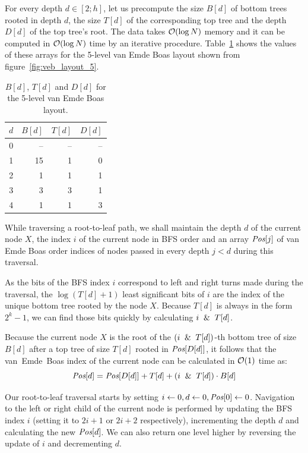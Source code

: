 For every depth $d\in[2;h]$, let us precompute the size $B[d]$ of
bottom trees rooted in depth $d$, the size $T[d]$ of the corresponding
top tree and the depth $D[d]$ of the top tree's root. The data takes $\mathcal{O}(\log
N)$ memory and it can be computed in $\mathcal{O}(\log N)$ time by an iterative procedure.
Table~\ref{tab:depth_data_example} shows the values of these arrays
for the 5-level van Emde Boas layout shown from figure~\ref{fig:veb_layout_5}.

\begin{table}[h]
	\centering
	\begin{tabular}{r|r|r|r}
		$d$ & $B[d]$ & $T[d]$ & $D[d]$ \\
		\hline
		0   & --     & --     & --     \\
		1   & 15     & 1      & 0      \\
		2   & 1      & 1      & 1      \\
		3   & 3      & 3      & 1      \\
		4   & 1      & 1      & 3
	\end{tabular}
	\caption{$B[d]$, $T[d]$ and $D[d]$ for the 5-level van Emde
	Boas layout.}
	\label{tab:depth_data_example}
\end{table}

\def\Pos{\hbox{\it Pos}}

While traversing a root-to-leaf path, we shall maintain the depth
$d$ of the current node $X$, the index $i$ of the current node in BFS order
and an array $\Pos[j]$ of van Emde Boas order indices of nodes passed in every
depth $j<d$ during this traversal.

As the bits of the BFS index $i$ correspond to left and right turns made during
the traversal, the $\log(T[d]+1)$ least significant bits of $i$ are the
index of the unique bottom tree rooted by the node $X$. Because $T[d]$ is
always in the form $2^k-1$, we can find those bits quickly by calculating
$i \And T[d]$.

Because the current node $X$ is the root of the $(i \And T[d])$-th
bottom tree of size $B[d]$ after a top tree of size $T[d]$ rooted in
$\Pos[D[d]]$, it follows that the van~Emde~Boas index of the current node can be
calculated in $\mathcal{O}(1)$ time as:
$$\Pos[d]=\Pos[D[d]] + T[d] + (i \And T[d]) \cdot B[d]$$

Our root-to-leaf traversal starts by setting $i\gets 0, d\gets 0,
\Pos[0]\gets 0$.
Navigation to the left or right child of the current node is performed
by updating the BFS index $i$ (setting it to $2i+1$ or $2i+2$ respectively),
incrementing the depth $d$ and calculating the new $\Pos[d]$.
We can also return one level higher by reversing the update of $i$ and
decrementing $d$.

